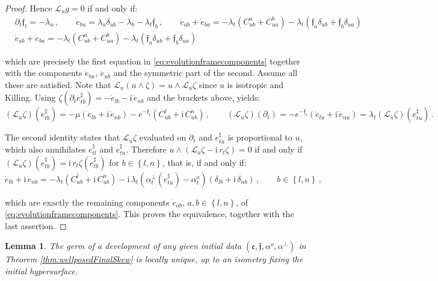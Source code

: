 \documentclass[10pt,reqno,a4paper]{amsart}
\theoremstyle{plain}
\newtheorem{lemma}[thm]{Lemma}
\theoremstyle{definition}
\theoremstyle{remark}
\theoremstyle{remark}
\def\cL{\mathcal{L}}
\def\cL{\mathcal{L}}
\def\fre{\mathfrak{e}}
\renewcommand{\(}{ (}
\renewcommand{\)}{ )}
\newcommand{\frf}{\mathfrak{f}}
\begin{document}
\begin{proof}
\noindent
Hence $\cL_{u}g = 0$ if and only if:
\begin{eqnarray*}
& \partial_t\frf_t = -\lambda_u \, , \qquad \dot{e}_{bu} = \lambda_u\delta_{ub} - \lambda_b - \lambda_t\frf_b\, , \qquad   \dot{e}_{ab} + \dot{e}_{ba} = -\lambda_t(C^a_{ub} + C^b_{ua}) - \lambda_t(\frf_a\delta_{ub} + \frf_b\delta_{ua}) \\
& \dot{e}_{ab} + \dot{e}_{ba} = -\lambda_t(C^a_{ub} + C^b_{ua}) - \lambda_t(\frf_a\delta_{ub} + \frf_b\delta_{ua})
\end{eqnarray*}

\noindent
which are precisely the first equation in \eqref{eq:evolutionframecomponents} together with the components $\dot{e}_{bu}$, $\dot{e}_{ub}$ and the symmetric part of the second. Assume all these are satisfied. Note that $\cL_{u}(u\wedge\zeta) = u\wedge\cL_{u}\zeta$ since $u$ is isotropic and Killing. Using $\zeta(\partial_t e^{\sharp}_{tb}) = -\dot{e}_{lb} - \mathrm{i}\, \dot{e}_{nb}$ and the brackets above, yields:
\begin{equation*}
(\cL_{u}\zeta)(e^{\sharp}_{tb}) = -\mu ( \dot{e}_{lb} + \mathrm{i}\, \dot{e}_{nb} ) - e^{-\frf_t} ( C^l_{ub} + \mathrm{i}\, C^n_{ub} )\, , \qquad (\cL_{u}\zeta)(\partial_t) = -e^{-\frf_t} ( \dot{e}_{lu} + \mathrm{i}\, \dot{e}_{nu} ) = \lambda_t (\cL_{u}\zeta)(e^{\sharp}_{tu})\, .
\end{equation*}

\noindent
The second identity states that $\cL_{u}\zeta$ evaluated on $\partial_t$ and $e^{\sharp}_{tu}$ is proportional to $u$, which also annihilates $e^{\sharp}_{tl}$ and $e^{\sharp}_{tn}$. Therefore $u\wedge(\cL_{u}\zeta - \mathrm{i}\, r_t\zeta) = 0$ if and only if $(\cL_{u}\zeta)(e^{\sharp}_{tb}) = \mathrm{i}\, r_t\zeta(e^{\sharp}_{tb})$ for $b\in\left\{ l,n\right\}$, that is, if and only if:
\begin{equation*}
\dot{e}_{lb} + \mathrm{i}\, \dot{e}_{nb} = -\lambda_t ( C^l_{ub} + \mathrm{i}\, C^n_{ub} ) - \mathrm{i}\, \lambda_t ( \alpha^{\perp}_t(e^{\sharp}_{tu}) - \alpha^o_t ) ( \delta_{lb} + \mathrm{i}\, \delta_{nb} )\, , \qquad b\in\left\{ l,n\right\}\, ,
\end{equation*}

\noindent
which are exactly the remaining components $\dot{e}_{ab}$, $a,b\in\left\{ l,n\right\}$, of \eqref{eq:evolutionframecomponents}. This proves the equivalence, together with the last assertion.
\end{proof}


\begin{lemma}
\label{lemma:uniqueevol}
The germ of a development of any given initial data $(\fre,\frf,\alpha^o,\alpha^{\perp})$ in Theorem \ref{thm:wellposedFinalSkew} is locally unique, up to an isometry fixing the initial hypersurface.
\end{lemma}
 
\end{document}
